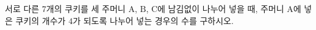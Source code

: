 서로 다른 7개의 쿠키를 세 주머니 $\mathrm{A}$, $\mathrm{B}$, $\mathrm{C}$에 남김없이 나누어 넣을 때, 주머니 $\mathrm{A}$에 넣은 쿠키의 개수가 $4$가 되도록 나누어 넣는 경우의 수를 구하시오. 
